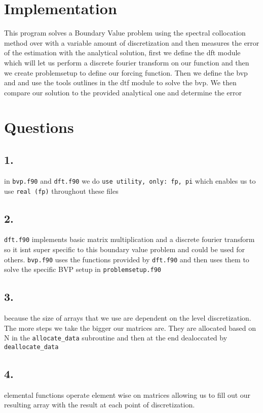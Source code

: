 \documentclass{article}
\begin{document}
    \section*{Implementation}
        This program solves a Boundary Value problem using the spectral collocation method
        over with a variable amount of discretization and then measures the error of the 
        estimation with the analytical solution, first we define the dft module which will let us perform a discrete fourier transform 
        on our function and then we create problemsetup to define our forcing function. Then we define the bvp and and use the tools outlines in the dtf module
        to solve the bvp. We then compare our solution to the provided analytical one and determine the error
    \section*{Questions}
        \subsection*{1.}
            in \texttt{bvp.f90} and \texttt{dft.f90} we do {\lstinline|use utility, only: fp, pi|}
            which enables us to use \texttt{real (fp)} throughout these files
        \subsection*{2.}
            \texttt{dft.f90} implements basic matrix multiplication and a discrete fourier transform so it 
            isnt super specific to this boundary value problem and could be used for others. \texttt{bvp.f90} uses
            the functions provided by \texttt{dft.f90} and then uses them to solve the specific BVP setup in 
            \texttt{problemsetup.f90}
        \subsection*{3.}
            because the size of arrays that we use are dependent on the level discretization. The more steps we take the bigger our 
            matrices are. They are allocated based on N in the \texttt{allocate\_data} subroutine and then at the end dealoccated by 
            \texttt{deallocate\_data}
        \subsection*{4.}
            elemental functions operate element wise on matrices allowing us to fill out our resulting array with the result at each point
            of discretization.
\end{document}
